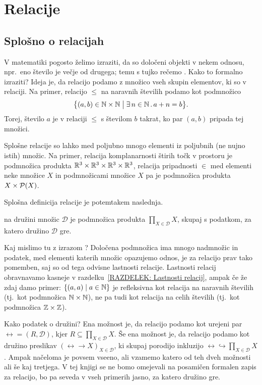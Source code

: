 \chapter{Relacije}\label{POGLAVJE: Relacije}

	\section{Splošno o relacijah}
	
		V matematiki pogosto želimo izraziti, da so določeni objekti v nekem odnosu, npr.~eno število je večje od drugega; temu s tujko rečemo . Kako to formalno izraziti? Ideja je, da relacijo podamo z množico vseh skupin elementov, ki so v relaciji. Na primer, relacijo $\leq$ na naravnih številih podamo kot podmnožico
		\[\set[1]{(a, b) \in \NN \times \NN}{\xsome{n}[\NN]{a + n = b}}.\]
		Torej, število $a$ je v relaciji $\leq$ s številom $b$ takrat, ko par $(a, b)$ pripada tej množici.
		
		Splošne relacije so lahko med poljubno mnogo elementi iz poljubnih (ne nujno istih) množic. Na primer, relacija komplanarnosti štirih točk v prostoru je podmnožica produkta $\mathbb{R}^3 \times \mathbb{R}^3 \times \mathbb{R}^3 \times \mathbb{R}^3$, relacija pripadnosti $\in$ med elementi neke množice $X$ in podmnožicami množice $X$ pa je podmnožica produkta $X \times \mathcal{P}(X)$.
		
		Splošna definicija relacije je potemtakem naslednja.
		\begin{definicija}
			 na družini množic $\mathscr{D}$ je podmnožica produkta $\prod_{X \in \mathscr{D}} X$, skupaj s podatkom, za katero družino $\mathscr{D}$ gre.
		\end{definicija}
		
		\begin{opomba}\label{OPOMBA: definicija relacij}
			Kaj mislimo tu z izrazom ? Določena podmnožica ima mnogo nadmnožic in podatek, med elementi katerih množic opazujemo odnos, je za relacijo prav tako pomemben, saj so od tega odvisne lastnosti relacije. Lastnosti relacij obravnavamo kasneje v razdelku~\ref{RAZDELEK: Lastnosti relacij}, ampak če že zdaj damo primer: $\set{(a, a)}{a \in \NN}$ je refleksivna kot relacija na naravnih številih (tj.~kot podmnožica $\mathbb{N} \times \mathbb{N}$), ne pa tudi kot relacija na celih številih (tj.~kot podmnožica $\mathbb{Z} \times \mathbb{Z}$).
			
			Kako  podatek o družini? Ena možnost je, da relacijo podamo kot urejeni par $\rel = (R, \mathscr{D})$, kjer $R \subseteq \prod_{X \in \mathscr{D}} X$. Še ena možnost je, da relacijo podamo kot družino preslikav $(\rel \to X)_{X \in \mathscr{D}}$, ki skupaj porodijo inkluzijo $\rel \hookrightarrow \prod_{X \in \mathscr{D}} X$. Ampak načeloma je povsem vseeno, ali vzamemo katero od teh dveh možnosti ali še kaj tretjega. V tej knjigi se ne bomo omejevali na posamičen formalen zapis za relacijo, bo pa seveda v vseh primerih jasno, za katero družino gre.
		\end{opomba}
		
